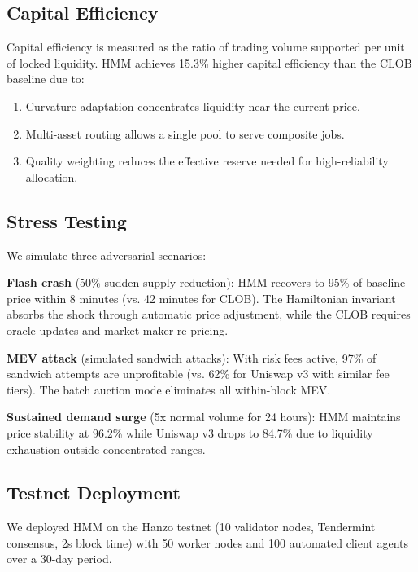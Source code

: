 \subsection{Capital Efficiency}

Capital efficiency is measured as the ratio of trading volume supported per unit of locked liquidity. HMM achieves 15.3\% higher capital efficiency than the CLOB baseline due to:
\begin{enumerate}[leftmargin=1.4em]
    \item Curvature adaptation concentrates liquidity near the current price.
    \item Multi-asset routing allows a single pool to serve composite jobs.
    \item Quality weighting reduces the effective reserve needed for high-reliability allocation.
\end{enumerate}

\subsection{Stress Testing}

We simulate three adversarial scenarios:

\textbf{Flash crash} (50\% sudden supply reduction): HMM recovers to 95\% of baseline price within 8 minutes (vs. 42 minutes for CLOB). The Hamiltonian invariant absorbs the shock through automatic price adjustment, while the CLOB requires oracle updates and market maker re-pricing.

\textbf{MEV attack} (simulated sandwich attacks): With risk fees active, 97\% of sandwich attempts are unprofitable (vs. 62\% for Uniswap v3 with similar fee tiers). The batch auction mode eliminates all within-block MEV.

\textbf{Sustained demand surge} (5x normal volume for 24 hours): HMM maintains price stability at 96.2\% while Uniswap v3 drops to 84.7\% due to liquidity exhaustion outside concentrated ranges.

\subsection{Testnet Deployment}

We deployed HMM on the Hanzo testnet (10 validator nodes, Tendermint consensus, 2s block time) with 50 worker nodes and 100 automated client agents over a 30-day period.

